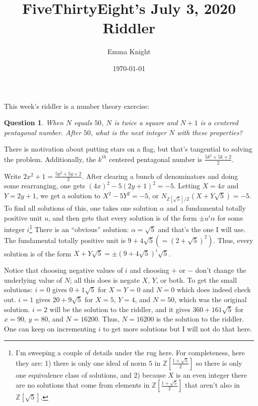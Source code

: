 \documentclass[11pt]{article}
\title{FiveThirtyEight's July 3, 2020 Riddler}
\author{Emma Knight}
\date{\today}
\newtheorem{question}[theorem]{Question}
\theoremstyle{definition}
\newcommand{\Z}{\mathbb{Z}}
\begin{document}
\maketitle
This week's riddler is a number theory exercise:
\begin{question}
When $N$ equals $50$, $N$ is twice a square and $N+1$ is a centered pentagonal number. After $50$, what is the next integer $N$ with these properties?
\end{question}
There is motivation about putting stars on a flag, but that's tangential to solving the problem.  Additionally, the $k^{th}$ centered pentagonal number is $\frac{5k^2 + 5k + 2}{2}$.

Write $2x^2 + 1 = \frac{5y^2 + 5y + 2}{2}$.  After clearing a bunch of denominators and doing some rearranging, one gets $(4x)^2 - 5(2y+1)^2 = -5$.  Letting $X = 4x$ and $Y = 2y+1$, we get a solution to $X^2-5Y^2 = -5$, or $N_{\Z[\sqrt{5}]/\Z}(X+Y\sqrt{5}) = -5$.  To find all solutions of this, one takes one solution $\alpha$ and a fundamental totally positive unit $u$, and then gets that every solution is of the form $\pm u^i \alpha$ for some integer $i$\footnote{I'm sweeping a couple of details under the rug here.  For completeness, here they are: 1) there is only one ideal of norm $5$ in $\Z[\frac{1+\sqrt{5}}{2}]$ so there is only one equivalence class of solutions, and 2) because $X$ is an even integer there are no solutions that come from elements in $\Z[\frac{1+\sqrt{5}}{2}]$ that aren't also in $\Z[\sqrt{5}]$.}  There is an ``obvious'' solution: $\alpha = \sqrt{5}$ and that's the one I will use.  The fundamental totally positive unit is $9+4\sqrt{5} (= (2+\sqrt{5})^2)$.  Thus, every solution is of the form $X+Y\sqrt{5} = \pm(9+4\sqrt{5})^i\sqrt{5}$.

Notice that choosing negative values of $i$ and choosing $+$ or $-$ don't change the underlying value of $N$; all this does is negate $X$, $Y$, or both.  To get the small solutions: $i = 0$ gives $0 + 1\sqrt{5}$ for $X = Y = 0$ and $N = 0$ which does indeed check out.  $i = 1$ gives $20+9\sqrt{5}$ for $X = 5$, $Y = 4$, and $N = 50$, which was the original solution.  $i = 2$ will be the solution to the riddler, and it gives $360+161\sqrt{5}$ for $x = 90$, $y = 80$, and $N = 16200$.  Thus, $N = 16200$ is the solution to the riddler.  One can keep on incrementing $i$ to get more solutions but I will not do that here.
\end{document}
